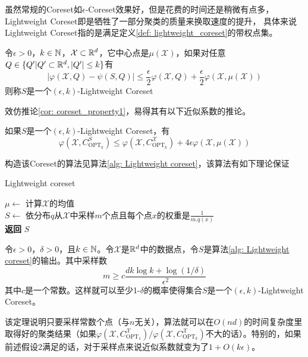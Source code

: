 虽然常规的Coreset如$\epsilon$-Coreset效果好，但是花费的时间还是稍微有点多，Lightweight Coreset即是牺牲了一部分聚类的质量来换取速度的提升， 具体来说Lightweight Coreset指的是满足定义\ref{def: lightweight_coreset}的带权点集。
\begin{definition}
    \label{def: lightweight_coreset}
    令$\epsilon > 0$，$k \in \mathbb{N}$，$\mathcal{X} \subset \mathbb{R}^d$，它中心点是$\mu(\mathcal{X})$，如果对任意$Q \in \{Q'| Q' \subset \mathbb{R}^d, |Q'| \leq k\}$有
    \begin{equation*}
        |\varphi(\mathcal{X},Q) - \psi(S,Q)| \leq \frac{\epsilon}{2}\varphi(\mathcal{X},Q) + \frac{\epsilon}{2}\varphi(\mathcal{X},\mu(\mathcal{X}))
    \end{equation*}
    则称$S$是一个$(\epsilon,k)$-Lightweight Coreset
\end{definition}
效仿推论\ref{cor: coreset_property1}，易得其有以下近似系数的推论。
\begin{corollary}
    如果$S$是一个$(\epsilon,k)$-Lightweight Coreset，有
    \begin{equation*}
        \varphi(\mathcal{X},C_{\text{OPT}_k}^S) \leq \varphi(\mathcal{X},C_{\text{OPT}_k}^{\mathcal{X}}) + 4\epsilon\varphi(\mathcal{X},\mu(\mathcal{X}))
    \end{equation*}
\end{corollary}
构造该Coreset的算法见算法\ref{alg: Lightweight coreset}，该算法有如下理论保证
\begin{algorithm}
    \caption{Lightweight coreset}\label{alg: Lightweight coreset}
    $\mu \gets$ 计算$\mathcal{X}$的均值 \\
    $S \gets $ 依分布$q$从$\mathcal{X}$中采样$m$个点且每个点$x$的权重是$\frac{1}{m.q(x)}$ \\
    \textbf{返回} $S$
\end{algorithm}
\begin{theorem}
    \label{theo: lightweight_coreset}
    令$\epsilon>0$，$\delta>0$，且$k\in \mathbb{N}$。令$\mathcal{X}$是$\mathbb{R}^d$中的数据点，令$S$是算法\ref{alg: Lightweight coreset}的输出。其中采样数
    \begin{equation*}
        m \geq c\frac{dk\log k + \log(1/\delta)}{\epsilon^2}
    \end{equation*}
    其中$c$是一个常数。这样就可以至少1-$\delta$的概率使得集合$S$是一个$(\epsilon,k)$-Lightweight Coreset。
\end{theorem}
该定理说明只要采样常数个点（与$n$无关），算法就可以在$O(nd)$的时间复杂度里取得好的聚类结果（如果$\varphi(\mathcal{X},C_{\text{OPT}_1}^{\mathcal{X}})/\varphi(\mathcal{X},C_{\text{OPT}_k}^{\mathcal{X}})$不大的话）。特别的，如果前述假设2满足的话，对于采样点来说近似系数就变为了$1+O(k\epsilon)$。%

